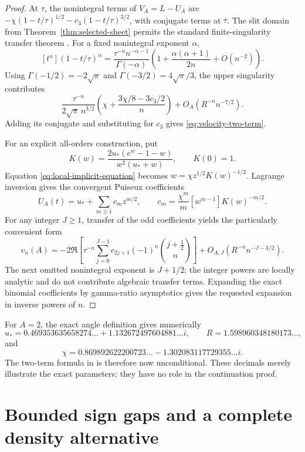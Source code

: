 \begin{proof}
At $\tau$, the nonintegral terms of $V_A=L-U_A$ are
$-\chi(1-t/\tau)^{1/2}-c_3(1-t/\tau)^{3/2}$, with conjugate terms
at $\overline\tau$.  The slit domain from
Theorem~\ref{thm:selected-sheet} permits the standard finite-singularity
transfer theorem \cite[Chapter~VI]{FlajoletSedgewick2009}.  For a fixed
nonintegral exponent $\alpha$,
\[
 [t^n](1-t/\tau)^\alpha
 =\frac{\tau^{-n}n^{-\alpha-1}}{\Gamma(-\alpha)}
     \left(1+\frac{\alpha(\alpha+1)}{2n}+O(n^{-2})\right).
\]
Using $\Gamma(-1/2)=-2\sqrt\pi$ and
$\Gamma(-3/2)=4\sqrt\pi/3$, the upper singularity contributes
\[
 \frac{\tau^{-n}}{2\sqrt\pi\,n^{3/2}}
       \left(\chi+\frac{3\chi/8-3c_3/2}{n}\right)
       +O_A(R^{-n}n^{-7/2}).
\]
Adding its conjugate and substituting for $c_3$ gives
\eqref{eq:velocity-two-term}.

For an explicit all-orders construction, put
\[
 K(w)=\frac{2u_*(e^w-1-w)}{w^2(u_*+w)},\qquad K(0)=1.
\]
Equation \eqref{eq:local-implicit-equation} becomes
$w=\chi z^{1/2}K(w)^{-1/2}$.  Lagrange inversion gives the convergent
Puiseux coefficients
\begin{equation}\label{eq:all-puiseux-coefficients}
 U_A(t)=u_*+\sum_{m\geq1}c_mz^{m/2},\qquad
 c_m=\frac{\chi^m}{m}[w^{m-1}]K(w)^{-m/2}.
\end{equation}
For any integer $J\geq1$, transfer of the odd coefficients yields the
particularly convenient form
\begin{equation}\label{eq:binomial-all-order}
 v_n(A)=-2\Re\left[\tau^{-n}
       \sum_{j=0}^{J-1}c_{2j+1}(-1)^n\binom{j+\tfrac12}{n}\right]
       +O_{A,J}(R^{-n}n^{-J-3/2}).
\end{equation}
The next omitted nonintegral exponent is $J+1/2$; the integer powers
are locally analytic and do not contribute algebraic transfer terms.
Expanding the exact binomial coefficients by gamma-ratio asymptotics
gives the requested expansion in inverse powers of $n$.
\end{proof}

For $A=2$, the exact angle definition gives numerically
\[
 u_*=0.469353635658274\ldots+1.132672497604881\ldots i,
 \qquad R=1.598960348180173\ldots,
\]
and
\[
 \chi=0.869892622200723\ldots-1.302083117729355\ldots i.
\]
The two-term formula in \cite{HarmonicBaseline} is therefore now
unconditional.  These decimals merely illustrate the exact parameters;
they have no role in the continuation proof.

\section{Bounded sign gaps and a complete density alternative}
\label{sec:velocity-signs}

